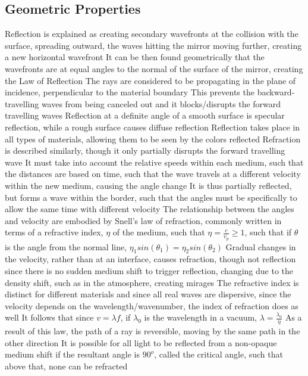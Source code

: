\documentclass[11 pt, twoside]{article}
\newenvironment{outline*}
{
	\begin{outline}[enumerate]
	}
	{\end{outline}
}
\begin{document}
\subsection{Geometric Properties}
\begin{outline*}
\1 Reflection is explained as creating secondary wavefronts at the collision with the surface, spreading outward, the waves hitting the mirror moving further, creating a new horizontal wavefront
\2 It can be then found geometrically that the wavefronts are at equal angles to the normal of the surface of the mirror, creating the Law of Reflection
\3 The rays are considered to be propagating in the plane of incidence, perpendicular to the material boundary
\2 This prevents the backward-travelling waves from being canceled out and it blocks/disrupts the forward travelling waves
\2 Reflection at a definite angle of a smooth surface is specular reflection, while a rough surface causes diffuse reflection
\2 Reflection takes place in all types of materials, allowing them to be seen by the colors reflected
\1 Refraction is described similarly, though it only partially disrupts the forward travelling wave
\2 It must take into account the relative speeds within each medium, such that the distances are based on time, such that the wave travels at a different velocity within the new medium, causing the angle change
\2 It is thus partially reflected, but forms a wave within the border, such that the angles must be specifically to allow the same time with different velocity
\1 The relationship between the angles and velocity are embodied by Snell's law of refraction, commonly written in terms of a refractive index, $\eta$ of the medium, such that $\eta = \frac{c}{v_p} \geq 1$, such that if $\theta$ is the angle from the normal line, $\eta_1 sin(\theta_1) = \eta_2 sin(\theta_2)$
\2 Gradual changes in the velocity, rather than at an interface, causes refraction, though not reflection since there is no sudden medium shift to trigger reflection, changing due to the density shift, such as in the atmosphere, creating mirages
\2 The refractive index is distinct for different materials and since all real waves are dispersive, since the velocity depends on the wavelength/wavenumber, the index of refraction does as well
\3 It follows that since $v = \lambda f$, if $\lambda_0$ is the wavelength in a vacuum, $\lambda = \frac{\lambda_0}{\eta}$
\2 As a result of this law, the path of a ray is reversible, moving by the same path in the other direction
\2 It is possible for all light to be reflected from a non-opaque medium shift if the resultant angle is $90^o$, called the critical angle, such that above that, none can be refracted

\end{outline*}
\end{document}
